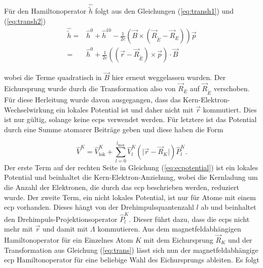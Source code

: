 	Für den Hamiltonoperator $\hat{\tilde{h}}$ folgt aus den Gleichungen (\ref{eq:transh1}) und (\ref{eq:transh2})
	\begin{equation}
	\begin{aligned}
	\hat{\tilde{h}}=&\hat{h}^0+\hat{h}^{10}-\frac{1}{2c}\left(\vec{B}\times\left(\vec{R}_{\tilde{E}}-\vec{R}_E\right)\right)\vec{p}\\
	=&\hat{h}^0+\frac{1}{2c}\left(\left(\vec{r}-\vec{R}_{\tilde{E}}\right)\times\vec{p}\right)\cdot\vec{B}
	\end{aligned}
	\end{equation}
	
	wobei die Terme quadratisch in $\vec{B}$ hier erneut weggelassen wurden. Der Eichursprung wurde durch die Transformation also von $\vec{R}_E$ auf $\vec{R}_{\tilde{E}}$ verschoben. Für diese Herleitung wurde davon ausgegangen, dass das Kern-Elektron-Wechselwirkung ein lokales Potential ist und daher nicht mit $\vec{r}$ kommutiert. Dies ist nur gültig, solange keine \acp{ecp} verwendet werden. Für letztere ist das Potential durch eine Summe atomarer Beiträge geben und diese haben die Form\supercite{cao2010relativistic}
	
	\begin{equation}\label{eq:ecpotential}
	\hat{V}^K=\hat{V}^K_{\textrm{lok}}+\sum_{l=0}^{l_{\textrm{max}}}\hat{V}_l^K\left(\vert\vec{r}-\vec{R}_K\vert\right)\hat{P}_l^K.
	\end{equation}
	Der erste Term auf der rechten Seite in Gleichung (\ref{eq:ecpotential}) ist ein lokales Potential und beinhaltet die Kern-Elektron-Anziehung, wobei die Kernladung um die Anzahl der Elektronen, die durch das \ac{ecp} beschrieben werden, reduziert wurde. Der zweite Term, ein nicht lokales Potential, ist nur für Atome mit einem \ac{ecp} vorhanden. Dieses hängt von der Drehimpulsquantenzahl $l$ ab und beinhaltet den Drehimpuls-Projektionsoperator $\hat{P}_l^K$. Dieser führt dazu, dass die \acp{ecp} nicht mehr mit $\vec{r}$ und damit mit $\Lambda$ kommutieren. Aus dem magnetfeldabhängigen Hamiltonoperator für ein Einzelnes Atom $K$ mit dem Eichursprung $\vec{R}_K$ und der Transformation aus Gleichung (\ref{eq:trans}) lässt sich nun der magnetfeldabhängige \ac{ecp} Hamiltonoperator für eine beliebige Wahl des Eichursprungs ableiten. Es folgt
	
